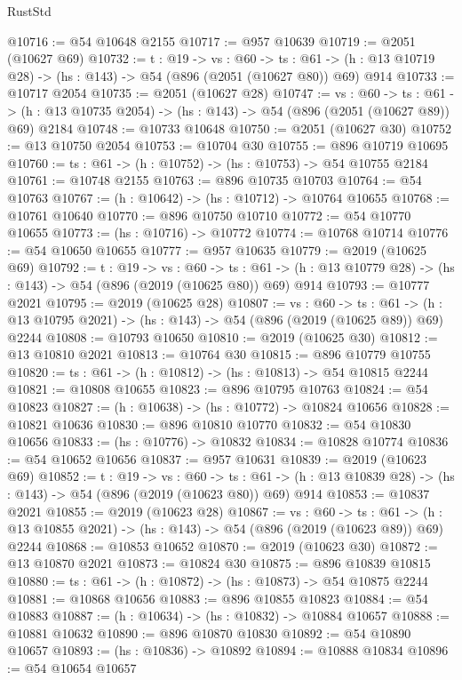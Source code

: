 \begin{lexlean}{RustStd}
\begin{coremodule}
@10716 := @54 @10648 @2155
@10717 := @957 @10639
@10719 := @2051 (@10627 @69)
@10732 := {t : @19} ->
  {vs : @60} ->
  {ts : @61} -> (h : @13 @10719 @28) -> (hs : @143) -> @54 (@896 (@2051 (@10627 @80)) @69) @914
@10733 := @10717 @2054
@10735 := @2051 (@10627 @28)
@10747 := {vs : @60} ->
  {ts : @61} -> (h : @13 @10735 @2054) -> (hs : @143) -> @54 (@896 (@2051 (@10627 @89)) @69) @2184
@10748 := @10733 @10648
@10750 := @2051 (@10627 @30)
@10752 := @13 @10750 @2054
@10753 := @10704 @30
@10755 := @896 @10719 @10695
@10760 := {ts : @61} -> (h : @10752) -> (hs : @10753) -> @54 @10755 @2184
@10761 := @10748 @2155
@10763 := @896 @10735 @10703
@10764 := @54 @10763
@10767 := (h : @10642) -> (hs : @10712) -> @10764 @10655
@10768 := @10761 @10640
@10770 := @896 @10750 @10710
@10772 := @54 @10770 @10655
@10773 := (hs : @10716) -> @10772
@10774 := @10768 @10714
@10776 := @54 @10650 @10655
@10777 := @957 @10635
@10779 := @2019 (@10625 @69)
@10792 := {t : @19} ->
  {vs : @60} ->
  {ts : @61} -> (h : @13 @10779 @28) -> (hs : @143) -> @54 (@896 (@2019 (@10625 @80)) @69) @914
@10793 := @10777 @2021
@10795 := @2019 (@10625 @28)
@10807 := {vs : @60} ->
  {ts : @61} -> (h : @13 @10795 @2021) -> (hs : @143) -> @54 (@896 (@2019 (@10625 @89)) @69) @2244
@10808 := @10793 @10650
@10810 := @2019 (@10625 @30)
@10812 := @13 @10810 @2021
@10813 := @10764 @30
@10815 := @896 @10779 @10755
@10820 := {ts : @61} -> (h : @10812) -> (hs : @10813) -> @54 @10815 @2244
@10821 := @10808 @10655
@10823 := @896 @10795 @10763
@10824 := @54 @10823
@10827 := (h : @10638) -> (hs : @10772) -> @10824 @10656
@10828 := @10821 @10636
@10830 := @896 @10810 @10770
@10832 := @54 @10830 @10656
@10833 := (hs : @10776) -> @10832
@10834 := @10828 @10774
@10836 := @54 @10652 @10656
@10837 := @957 @10631
@10839 := @2019 (@10623 @69)
@10852 := {t : @19} ->
  {vs : @60} ->
  {ts : @61} -> (h : @13 @10839 @28) -> (hs : @143) -> @54 (@896 (@2019 (@10623 @80)) @69) @914
@10853 := @10837 @2021
@10855 := @2019 (@10623 @28)
@10867 := {vs : @60} ->
  {ts : @61} -> (h : @13 @10855 @2021) -> (hs : @143) -> @54 (@896 (@2019 (@10623 @89)) @69) @2244
@10868 := @10853 @10652
@10870 := @2019 (@10623 @30)
@10872 := @13 @10870 @2021
@10873 := @10824 @30
@10875 := @896 @10839 @10815
@10880 := {ts : @61} -> (h : @10872) -> (hs : @10873) -> @54 @10875 @2244
@10881 := @10868 @10656
@10883 := @896 @10855 @10823
@10884 := @54 @10883
@10887 := (h : @10634) -> (hs : @10832) -> @10884 @10657
@10888 := @10881 @10632
@10890 := @896 @10870 @10830
@10892 := @54 @10890 @10657
@10893 := (hs : @10836) -> @10892
@10894 := @10888 @10834
@10896 := @54 @10654 @10657

\end{coremodule}
\end{lexlean}
